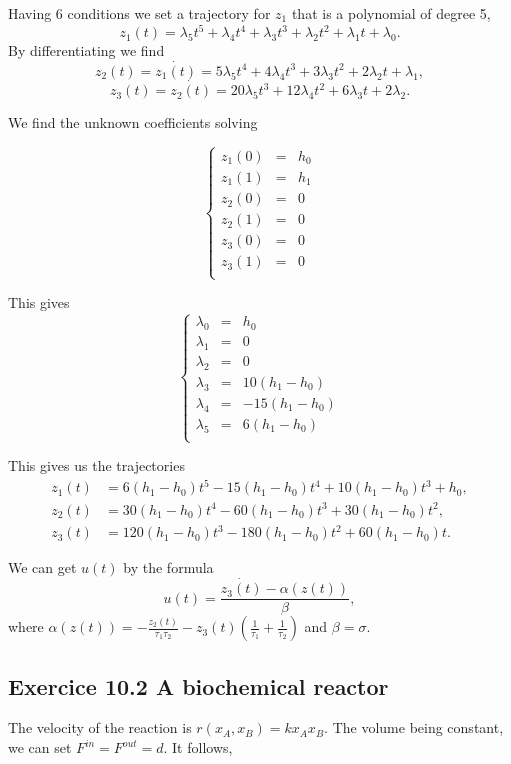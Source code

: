 Having $6$ conditions we set a trajectory for $z_{1}$ that is a polynomial of degree 5, 
$$z_{1}(t)=\lambda_{5} t^{5}+\lambda_{4} t^{4} + \lambda_{3} t^{3} + \lambda_{2} t^{2} +\lambda_{1} t+\lambda_{0}.$$
By differentiating we find
$$z_{2}(t)=\dot{z_{1}(t)}=5\lambda_{5} t^{4}+4\lambda_{4} t^{3} + 3\lambda_{3} t^{2} + 2\lambda_{2} t +\lambda_{1},$$
$$z_{3}(t)=\dot{z_{2}(t)}=20\lambda_{5} t^{3}+12\lambda_{4} t^{2} + 6\lambda_{3} t + 2\lambda_{2}.$$

We find the unknown coefficients solving

$$\left\{\begin{array}{ccc}
z_{1}(0) & = & h_{0}\\
z_{1}(1) & = & h_{1}\\
z_{2}(0) & = & 0\\
z_{2}(1) & = & 0\\
z_{3}(0) & = & 0\\
z_{3}(1) & = & 0\\
\end{array}\right.$$

This gives 
$$\left\{\begin{array}{ccc}
\lambda_{0} & = & h_{0}\\
\lambda_{1} & = & 0\\
\lambda_{2} & = & 0\\
\lambda_{3}& = & 10(h_{1}-h_{0})\\
\lambda_{4}& = & -15(h_{1}-h_{0})\\
\lambda_{5}& = & 6(h_{1}-h_{0})\\
\end{array}\right.$$



This gives us the trajectories
\begin{align*}
z_{1}(t)&=6(h_{1}-h_{0}) t^{5}-15(h_{1}-h_{0}) t^{4} + 10(h_{1}-h_{0}) t^{3} + h_{0},\\
z_{2}(t)&=30(h_{1}-h_{0}) t^{4}-60(h_{1}-h_{0}) t^{3} + 30(h_{1}-h_{0}) t^{2},\\
z_{3}(t)&=120(h_{1}-h_{0}) t^{3}-180(h_{1}-h_{0}) t^{2} + 60(h_{1}-h_{0}) t.
\end{align*}


We can get $u(t)$ by the formula
$$u(t)=\dfrac{\dot{z_{3}(t)}-\alpha(z(t))}{\beta},$$
where $\alpha(z(t))=-\frac{z_{2}(t)}{\tau_{1}\tau_{2}}-z_{3}(t)(\frac{1}{\tau_{1}}+\frac{1}{\tau_{2}})$ and $\beta=\sigma$.\\


\subsection*{Exercice 10.2 A biochemical reactor}
The velocity of the reaction is $r(x_{A},x_{B})=kx_{A}x_{B}$. The volume being constant, we can set $F^{in}=F^{out}=d$. It follows, 

